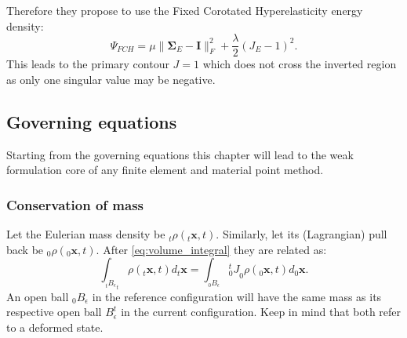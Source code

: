 \documentclass[m,times]{cgMA}
\begin{document}
Therefore they propose to use the Fixed Corotated Hyperelasticity energy density:
\begin{equation}
  \Psi_{FCH} = \mu \|\boldsymbol{\Sigma}_E - \boldsymbol{I}\|^2_F + \frac{\lambda}{2}(J_E-1)^2.
\end{equation}
This leads to the primary contour $J=1$ which does not cross the inverted region as only one singular value may be negative.
\begin{flushright}\cite{MPM:INVERT}\end{flushright}
\subsection{Governing equations}
Starting from the governing equations this chapter will lead to the weak formulation core of any finite element and material point method.
\subsubsection{Conservation of mass}
Let the Eulerian mass density be $_t\rho(_t\boldsymbol{x},t)$. Similarly, let its (Lagrangian) pull back be $_0\rho(_0\boldsymbol{x},t)$.
After \ref{eq:volume_integral} they are related as:
\begin{equation} \label{eq:density_pull_back}
  \int _ {_tB _ { \epsilon }}_t\rho(_t\boldsymbol{x},t)d_t\boldsymbol{x} =   \int _ {_0B _ { \epsilon }} {^t_0J}_0\rho(_0\boldsymbol{x},t) d_0\boldsymbol{x}.
\end{equation}
An open ball $ _ { 0 }B _ { \epsilon } $ in the reference configuration will have the same mass as its respective open ball $B_{\epsilon}^t$ in the current configuration. Keep in mind that both refer to a deformed state.
\end{document}
